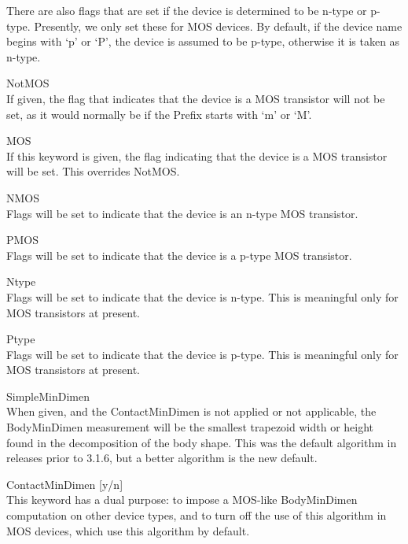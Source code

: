 There are also flags that are set if the device is determined to be
n-type or p-type.  Presently, we only set these for MOS devices.  By
default, if the device name begins with `p' or `P', the device is
assumed to be p-type, otherwise it is taken as n-type. 

\begin{description}
\item{\et NotMOS}\\
If given, the flag that indicates that the device is a MOS transistor
will not be set, as it would normally be if the {\vt Prefix} starts
with `m' or `M'.

\item{\et MOS}\\
If this keyword is given, the flag indicating that the device is a MOS
transistor will be set.  This overrides {\et NotMOS}.

\item{\et NMOS}\\
Flags will be set to indicate that the device is an n-type MOS
transistor.

\item{\et PMOS}\\
Flags will be set to indicate that the device is a p-type MOS
transistor.

\item{\et Ntype}\\
Flags will be set to indicate that the device is n-type.  This is
meaningful only for MOS transistors at present.

\item{\et Ptype}\\
Flags will be set to indicate that the device is p-type.  This is
meaningful only for MOS transistors at present.

\item{\et SimpleMinDimen}\\
When given, and the {\et ContactMinDimen} is not applied or not
applicable, the {\et BodyMinDimen} measurement will be the smallest
trapezoid width or height found in the decomposition of the body
shape.  This was the default algorithm in releases prior to 3.1.6, but
a better algorithm is the new default.

\item{{\et ContactMinDimen} [{\vt y/n}]}\\
This keyword has a dual purpose:  to impose a MOS-like {\et
BodyMinDimen} computation on other device types, and to turn off the
use of this algorithm in MOS devices, which use this algorithm by
default.


\end{description}
